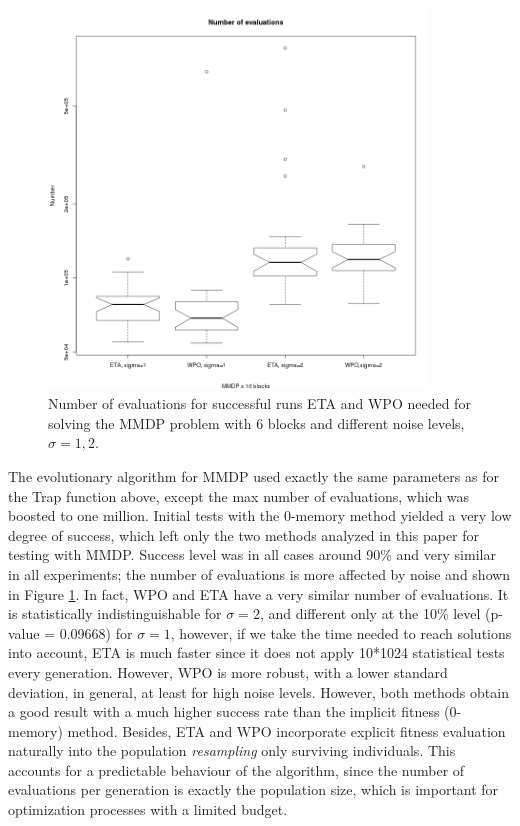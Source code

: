 \documentclass{llncs}
\begin{document}
\begin{figure}[h!tb]
\centering
\includegraphics[width=0.9\textwidth]{../images/evals-mmdp.png}
\caption{Number of evaluations for successful runs ETA and WPO needed for solving the MMDP
  problem with 6 blocks and different noise levels, $\sigma=1,2$. \label{fig:mmdp:evals}}
\end{figure}
%
The evolutionary algorithm for MMDP used exactly the same parameters
as for the Trap function above, except the max number of evaluations, which
was boosted to one million. Initial tests with the 0-memory method
yielded a very low degree of success, which left only the two methods
analyzed in this paper for testing with MMDP. 
Success level was in all cases around 90\% and very similar in all experiments; the number of evaluations is more affected by noise and shown in
Figure \ref{fig:mmdp:evals}. 
In fact, WPO and ETA have a very similar
number of evaluations. It is statistically indistinguishable for
$\sigma=2$, and different only at the 10\% level (p-value = 0.09668)
for $\sigma=1$, however, if we take the time needed to reach solutions
into account, ETA is much faster since it does not apply 10*1024
statistical tests every generation. However, WPO is more robust, with
a lower standard deviation, in general, at least for high noise
levels. However, both methods obtain a good result with a much higher
success rate than the implicit fitness (0-memory) method. Besides, ETA and WPO 
incorporate explicit fitness evaluation naturally into the population
{\em resampling} only surviving individuals. This accounts for a
predictable behaviour of the algorithm, since the number of evaluations
per generation is exactly the population size, which is important for
optimization processes with a limited budget. 
\end{document}
